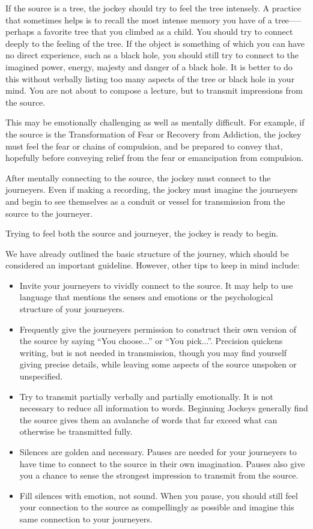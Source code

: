 \documentclass[12pt]{book}
\begin{document}
If the source is a tree, the jockey should try to feel the tree intensely. A practice that sometimes helps is to recall the most intense memory you have of a tree—--perhaps a favorite tree that you climbed as a child. You should try to connect deeply  to the feeling of the tree. If the object is something of which you can have no direct experience, such as a black hole, you should still try to connect to the imagined power, energy, majesty and danger of a black hole. It is better to do this without verbally listing too many aspects of the tree or black hole in your mind. You are not about to compose a lecture, but to transmit impressions from the source.
					
This may be emotionally challenging as well as mentally difficult. For example, if the source is the Transformation of Fear or Recovery from Addiction, the jockey must feel the fear or chains of compulsion, and be prepared to convey that, hopefully before conveying relief from the fear or emancipation from compulsion.
					
After mentally connecting to the source, the jockey must connect to the journeyers. Even if making a recording, the jockey must imagine the journeyers and begin to see themselves as a conduit or vessel for transmission from the source to the journeyer.
					
Trying to feel both the source and journeyer, the jockey is ready to begin.
					
We have already outlined the basic structure of the journey, which should be considered an important guideline. However, other tips to keep in mind include:
					

	\begin{itemize}
\item 
  Invite your journeyers to vividly connect to the source. It may help to use language that mentions the senses and emotions or the psychological structure of your journeyers.
\item 		
  Frequently give the journeyers permission to construct their own version of the source by saying ``You choose...'' or ``You pick...''.
  Precision quickens writing, but is not needed in transmission, though you may find yourself giving precise details, while leaving some aspects of the source unspoken or unspecified.
\item 		
  Try to transmit partially verbally and partially emotionally. It is not necessary to reduce all information to words. Beginning Jockeys  generally find the source gives them an avalanche of words that far exceed what can otherwise  be transmitted fully.
\item 		
Silences are golden and necessary. Pauses are needed for your journeyers to have time to connect to the source in their own imagination.
Pauses also give you a chance to sense the strongest impression to transmit from the source.
\item 
Fill silences with emotion, not sound. When you pause, you should still feel your connection to the source as compellingly as possible and imagine this same connection to your journeyers.
\end{itemize}
  
\end{document}

